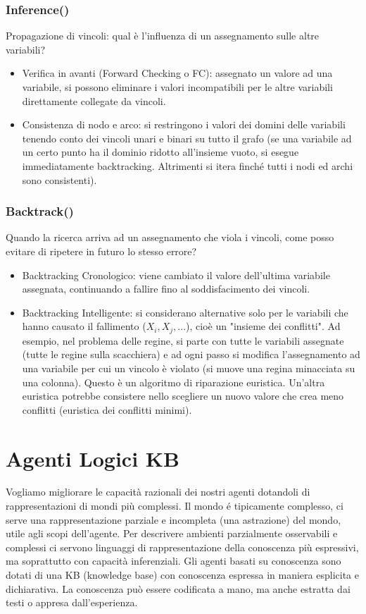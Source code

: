 \documentclass{article}
\begin{document}
\subsubsection{Inference()}
Propagazione di vincoli: qual è l'influenza di un assegnamento sulle altre variabili?
\begin{itemize}
    \item Verifica in avanti (Forward Checking o FC): assegnato un valore ad una variabile, si possono eliminare i valori incompatibili per le altre variabili direttamente collegate da vincoli.
    \item Consistenza di nodo e arco: si restringono i valori dei domini delle variabili tenendo conto dei vincoli unari e binari su tutto il grafo (se una variabile ad un certo punto ha il dominio ridotto all'insieme vuoto, si esegue immediatamente backtracking. Altrimenti si itera finché tutti i nodi ed archi sono consistenti).
\end{itemize}

\subsubsection{Backtrack()}
Quando la ricerca arriva ad un assegnamento che viola i vincoli, come posso evitare di ripetere in futuro lo stesso errore?
\begin{itemize}
    \item Backtracking Cronologico: viene cambiato il valore dell'ultima variabile assegnata, continuando a fallire fino al soddisfacimento dei vincoli.
    \item Backtracking Intelligente: si considerano alternative solo per le variabili che hanno causato il fallimento ($X_i, X_j, ...$), cioè un "insieme dei conflitti". Ad esempio, nel problema delle regine, si parte con tutte le variabili assegnate (tutte le regine sulla scacchiera) e ad ogni passo si modifica l’assegnamento ad una variabile per cui un vincolo è violato (si muove una regina minacciata su una colonna). Questo è un algoritmo di riparazione euristica. Un’altra euristica potrebbe consistere nello scegliere un nuovo valore che crea meno conflitti (euristica dei conflitti minimi).
\end{itemize}
\clearpage 

\section{Agenti Logici KB}
Vogliamo migliorare le capacità razionali dei nostri agenti dotandoli di rappresentazioni di mondi più complessi. Il mondo é tipicamente complesso, ci serve una rappresentazione parziale e incompleta (una astrazione) del mondo, utile agli scopi dell'agente. Per descrivere ambienti parzialmente osservabili e complessi ci servono linguaggi di rappresentazione della conoscenza più espressivi, ma soprattutto con capacità inferenziali. Gli agenti basati su conoscenza sono dotati di una KB (knowledge base) con conoscenza espressa in maniera esplicita e dichiarativa. La conoscenza può essere codificata a mano, ma anche estratta dai testi o appresa dall'esperienza.
\end{document}
